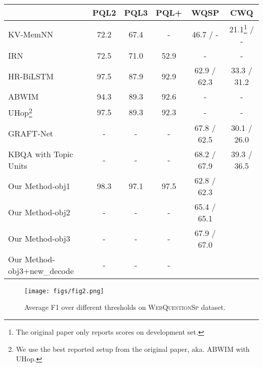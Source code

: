\begin{table*}[h]\centering
\begin{tabular}{|l|c|c|c|c|c|}
\hline
                            & PQL2 & PQL3 & PQL+ & WQSP & CWQ \\
\hline
KV-MemNN \cite{DBLP:conf/emnlp/MillerFDKBW16}    & 72.2 & 67.4 & -    & 46.7 / - & 21.1\footnote{The original paper only reports scores on development set.} / -      \\
IRN \cite{DBLP:conf/coling/ZhouHZ18}                         & 72.5 & 71.0   & 52.9 & -    & -         \\
HR-BiLSTM \cite{DBLP:conf/acl/YuYHSXZ17}                  & 97.5 & 87.9 & 92.9 & 62.9 / 62.3 & 33.3 / 31.2         \\
ABWIM \cite{DBLP:journals/corr/abs-1801-09893}                      & 94.3 & 89.3 & 92.6 & -    & -         \\
UHop\footnote{We use the best reported setup from the original paper, aka. ABWIM with UHop.} \cite{DBLP:conf/naacl/ChenCCNK19}                       & 97.5 & 89.3 & 92.3 & -    & -         \\
GRAFT-Net \cite{DBLP:conf/emnlp/SunDZMSC18}                  & -    & -    & -    & 67.8 / 62.5 & 30.1 / 26.0      \\
KBQA with Topic Units \cite{DBLP:conf/ijcai/LanW019}                  & -    & -    & -    & 68.2 / 67.9 & 39.3 / 36.5      \\
\hline
Our Method-obj1             & 98.3 & 97.1 & 97.5 &    62.8 / 62.3  &           \\
Our Method-obj2             &   -   &   -   &   -   &  65.4 / 65.1     &           \\
Our Method-obj3             &     - &  -    &   -   &   67.9 / 67.0    &           \\
Our Method-obj3+new\_decode & -     &   -   &    -   &     &          \\
\hline
\end{tabular}
\caption{\fontsize{10}{12}\selectfont We report Accuracy on PQL and hits@1 and F1 on WQSP and CWQ. All scores except our method are copied from the previous published papers. obj1/2: $P(ans, path|x)= P(ans|path,x)*P(path|x)$ with single/multiple reasoning paths for one sample. obj3: $P(ans) = sum_path(P(ans|path,x)*P(path|x))$, new\_decode: use beam search and multi paths in decoding.}\label{tab:main}
\end{table*}


\begin{figure}[h]
\centering
\texttt{[image: figs/fig2.png]}
\vspace{-2ex}
\caption{\fontsize{10}{12}\selectfont Average F1 over different thresholds on \textsc{WebQuestionSp} dataset.}
\label{fig:k2}
\end{figure}


